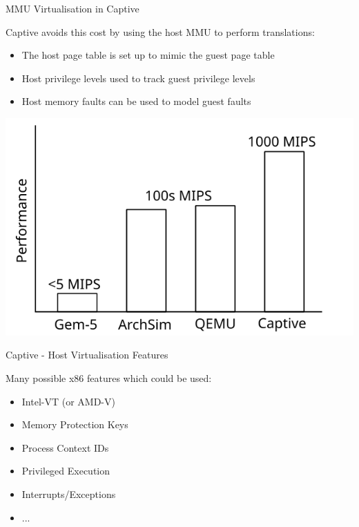 \begin{frame}{MMU Virtualisation in Captive}

Captive avoids this cost by using the host MMU to perform translations:

\begin{itemize}
\item The host page table is set up to mimic the guest page table
\item Host privilege levels used to track guest privilege levels
\item Host memory faults can be used to model guest faults
\end{itemize}

\end{frame}

\begin{frame}
\centering
\includegraphics{figures/comparison-chart-captive}
\end{frame}

\begin{frame}{Captive - Host Virtualisation Features}

Many possible x86 features which could be used:

\begin{itemize}
	\item Intel-VT (or AMD-V)
	\item Memory Protection Keys
	\item Process Context IDs
	\item Privileged Execution
	\item Interrupts/Exceptions
	\item ...
\end{itemize}

\end{frame}
